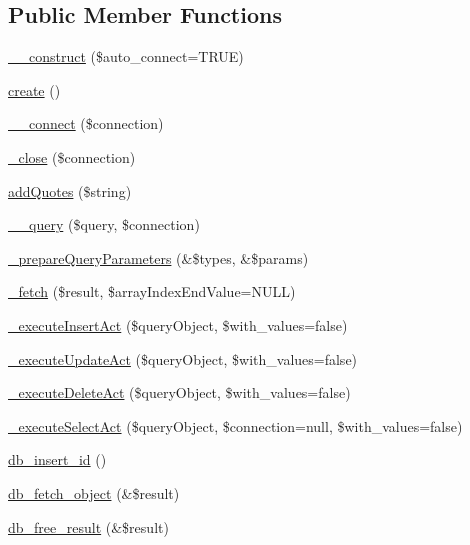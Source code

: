 \subsection*{Public Member Functions}
\begin{DoxyCompactItemize}
\item 
\hyperlink{classDBMysqli_a39ddc29a5ed6665dfaa85b69a8d00e53}{\-\_\-\-\_\-construct} (\$auto\-\_\-connect=T\-R\-U\-E)
\item 
\hyperlink{classDBMysqli_a589dd45054eb50e666c3a57815631111}{create} ()
\item 
\hyperlink{classDBMysqli_a7c041395f7926e0ec84186aa9eabc138}{\-\_\-\-\_\-connect} (\$connection)
\item 
\hyperlink{classDBMysqli_afd6324d65eaf95dbd8e6fa2f97b9b9db}{\-\_\-close} (\$connection)
\item 
\hyperlink{classDBMysqli_a29266a97d63be11763eb24926d39f544}{add\-Quotes} (\$string)
\item 
\hyperlink{classDBMysqli_aa7e47178c283abd8ba1bb7c8d0a31c66}{\-\_\-\-\_\-query} (\$query, \$connection)
\item 
\hyperlink{classDBMysqli_ab884208e90c71708faca2e56c5da0666}{\-\_\-prepare\-Query\-Parameters} (\&\$types, \&\$params)
\item 
\hyperlink{classDBMysqli_a4b5becb1ab24b99a184fe1942bc73280}{\-\_\-fetch} (\$result, \$array\-Index\-End\-Value=N\-U\-L\-L)
\item 
\hyperlink{classDBMysqli_a6a62a12cd9c46aac0242e81f58a25803}{\-\_\-execute\-Insert\-Act} (\$query\-Object, \$with\-\_\-values=false)
\item 
\hyperlink{classDBMysqli_acc5f5408c3717c88411a238e1e176785}{\-\_\-execute\-Update\-Act} (\$query\-Object, \$with\-\_\-values=false)
\item 
\hyperlink{classDBMysqli_a3dc572c5b452c7a2e0e150f6b8af622e}{\-\_\-execute\-Delete\-Act} (\$query\-Object, \$with\-\_\-values=false)
\item 
\hyperlink{classDBMysqli_a76e3f67b339c7613ad1d6e33af04e51e}{\-\_\-execute\-Select\-Act} (\$query\-Object, \$connection=null, \$with\-\_\-values=false)
\item 
\hyperlink{classDBMysqli_a080939c13758f00ecd0092eda6cd2452}{db\-\_\-insert\-\_\-id} ()
\item 
\hyperlink{classDBMysqli_a9e173fea0afa5c419977be95d1859892}{db\-\_\-fetch\-\_\-object} (\&\$result)
\item 
\hyperlink{classDBMysqli_a8639ebaca8bae119797a084af68750cc}{db\-\_\-free\-\_\-result} (\&\$result)
\end{DoxyCompactItemize}
